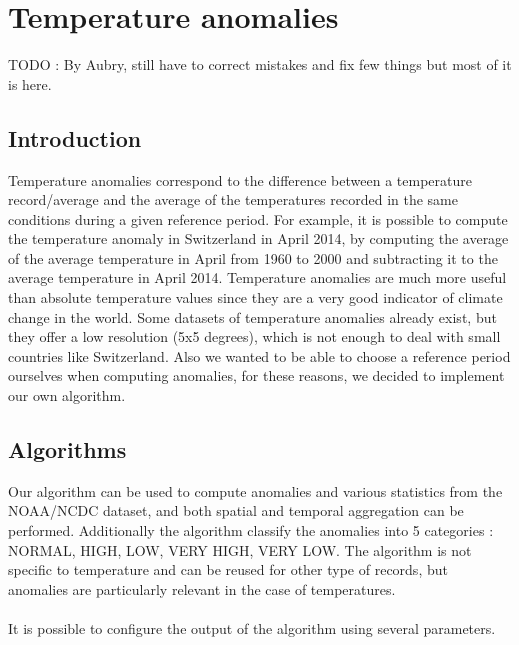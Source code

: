 \section{Temperature anomalies}
TODO : By Aubry, still have to correct mistakes and fix few things but most of it is here.
\subsection{Introduction}

Temperature anomalies correspond to the difference between a temperature record/average
and the average of the temperatures recorded in the same conditions during a given reference period.
For example, it is possible to compute the temperature anomaly in Switzerland in April 2014, by
computing the average of the average temperature in April from 1960 to 2000 and subtracting it to the
average temperature in April 2014. Temperature anomalies are much more useful than absolute temperature values since
 they are a very good indicator of climate change in the world.
Some datasets of temperature anomalies already exist, but they offer a
low resolution (5x5 degrees), which is not enough to deal with small countries like Switzerland.
Also we wanted to be able to choose a reference period ourselves when computing anomalies, for these reasons,
we decided to implement our own algorithm.

\subsection{Algorithms}

Our algorithm can be used to compute anomalies and various statistics from the NOAA/NCDC dataset, and both spatial and temporal aggregation
can be performed. Additionally the algorithm classify the anomalies into 5 categories : NORMAL, HIGH, LOW, VERY HIGH, VERY LOW.
The algorithm is not specific to temperature and can be reused for other type of records, but anomalies are particularly relevant in the case of temperatures.\\
\\It is possible to configure the output of the algorithm using several parameters.

